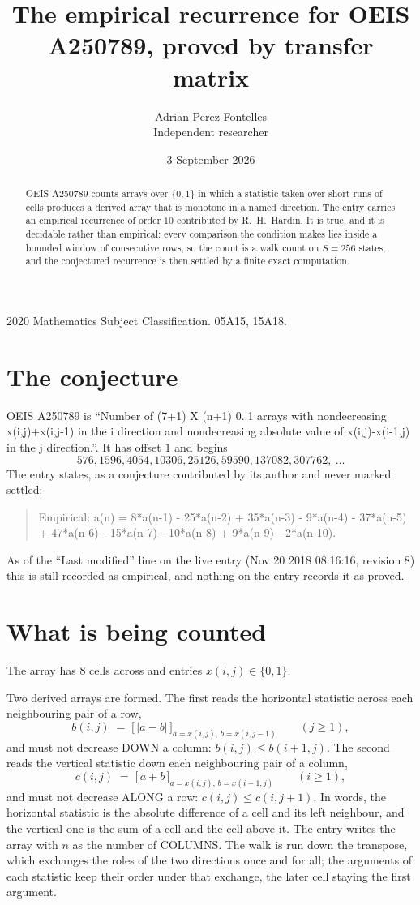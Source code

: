 \documentclass[11pt,a4paper]{article}
\title{The empirical recurrence for OEIS A250789, proved by transfer matrix}
\author{Adrian Perez Fontelles\\ \small Independent researcher}
\date{3 September 2026}
\theoremstyle{plain}
\theoremstyle{definition}
\begin{document}
\maketitle

\begin{abstract}
OEIS A250789 counts arrays over $\{0,1\}$ in which a statistic taken over short runs
of cells produces a derived array that is monotone in a named direction. The entry carries an
empirical recurrence of order $10$ contributed by R.~H.~Hardin. It is true, and it is
decidable rather than empirical: every comparison the condition makes lies inside a bounded
window of consecutive rows, so the count is a walk count on $S=256$ states, and the
conjectured recurrence is then settled by a finite exact computation.
\end{abstract}

\noindent\small 2020 Mathematics Subject Classification. 05A15, 15A18.\normalsize

\section{The conjecture}

OEIS A250789 is ``Number of (7+1) X (n+1) 0..1 arrays with nondecreasing x(i,j)+x(i,j-1) in the i direction and nondecreasing absolute value of x(i,j)-x(i-1,j) in the j direction.''. It has offset $1$ and begins
\[
576, 1596, 4054, 10306, 25126, 59590, 137082, 307762,\ \dots
\]
The entry states, as a conjecture contributed by its author and never marked settled:
\begin{quote}
Empirical: a(n) = 8*a(n-1) - 25*a(n-2) + 35*a(n-3) - 9*a(n-4) - 37*a(n-5) + 47*a(n-6) - 15*a(n-7) - 10*a(n-8) + 9*a(n-9) - 2*a(n-10).
\end{quote}
As of the ``Last modified'' line on the live entry (Nov 20 2018 08:16:16, revision 8) this is still
recorded as empirical, and nothing on the entry records it as proved.

\section{What is being counted}

The array has $8$ cells across and entries $x(i,j)\in\{0,1\}$.

Two derived arrays are formed. The first reads the horizontal statistic across each
neighbouring pair of a row,
\[
b(i,j)\;=\;\bigl[\,\lvert a-b\rvert\,\bigr]_{a=x(i,j),\,b=x(i,j-1)}\qquad (j\ge1),
\]
and must not decrease DOWN a column: $b(i,j)\le b(i{+}1,j)$. The second reads the vertical
statistic down each neighbouring pair of a column,
\[
c(i,j)\;=\;\bigl[\,a+b\,\bigr]_{a=x(i,j),\,b=x(i{-}1,j)}\qquad (i\ge1),
\]
and must not decrease ALONG a row: $c(i,j)\le c(i,j{+}1)$. In words, the horizontal statistic
is the absolute difference of a cell and its left neighbour, and the vertical one is
the sum of a cell and the cell above it. The entry writes the array with $n$ as the number of COLUMNS. The walk is run down the transpose, which exchanges the roles of the two directions once and for all; the arguments of each statistic keep their order under that exchange, the later cell staying the first argument.
\end{document}

